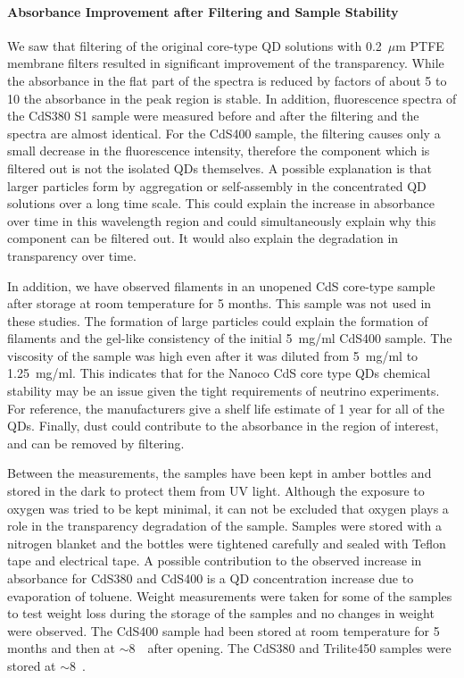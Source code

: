 \documentclass[cits]{JINST}
\begin{document}
\paragraph{Absorbance Improvement after Filtering and Sample Stability}
We saw that filtering of the original core-type QD solutions with 0.2~$\mu$m PTFE membrane filters resulted in significant improvement of the transparency. While the absorbance in the flat part of the spectra is reduced by factors of about 5 to 10 the absorbance in the peak region is stable. In addition, fluorescence spectra of the CdS380 S1 sample were measured before and after the filtering and the spectra are almost identical. For the CdS400 sample, the filtering causes only a small decrease in the fluorescence intensity, therefore the component which is filtered out is not the isolated QDs themselves. A possible explanation is that larger particles form by aggregation or self-assembly in the concentrated QD solutions over a long time scale. This could explain the increase in absorbance over time in this wavelength region and could simultaneously explain why this component can be filtered out. It would also explain the degradation in transparency over time. 

In addition, we have observed filaments in an unopened CdS core-type sample after storage at room temperature for 5 months. This sample was not used in these studies. The formation of large particles could explain the formation of filaments and the gel-like consistency of the initial 5~mg/ml CdS400 sample. The viscosity of the sample was high even after it was diluted from 5~mg/ml to 1.25~mg/ml. This indicates that for the Nanoco CdS core type QDs chemical stability may be an issue given the tight requirements of neutrino experiments. For reference, the manufacturers give a shelf life estimate of 1 year for all of the QDs. Finally, dust could contribute to the absorbance in the region of interest, and can be removed by filtering.  

Between the measurements, the samples have been kept in amber bottles and stored in the dark to protect them from UV light. Although the exposure to oxygen was tried to be kept minimal, it can not be excluded that oxygen plays a role in the transparency degradation of the sample. Samples were stored with a nitrogen blanket and the bottles were tightened carefully and sealed with Teflon tape and electrical tape. A possible contribution to the observed increase in absorbance for CdS380 and CdS400 is a QD concentration increase due to evaporation of toluene. Weight measurements were taken for some of the samples to test weight loss during the storage of the samples and no changes in weight were observed. The CdS400 sample had been stored at room temperature for 5 months and then at $\sim$8~\textcelsius~after opening. The CdS380 and Trilite450 samples were stored at $\sim$8~\textcelsius.
\end{document}
